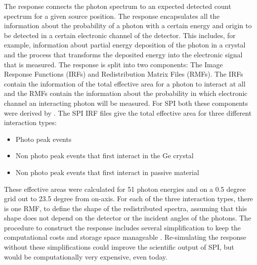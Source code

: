 \documentclass[twocolumn,traditabstract]{aa}
\begin{document}
The response connects the photon spectrum to an expected detected count spectrum for a given source position. The response encapsulates all the information about the probability of a photon with a certain energy and origin to be detected in a certain electronic channel of the detector. This includes, for example, information about partial energy deposition of the photon in a crystal and the process that transforms the deposited energy into the electronic signal that is measured.
The response is split into two components: The Image Response Functions (IRFs) and Redistribution Matrix Files (RMFs). The IRFs contain the information of the total effective area for a photon to interact at all and the RMFs contain the information about the probability in which electronic channel an interacting photon will be measured. For SPI both these components were derived by \citet{spi_response}.
The SPI IRF files give the total effective area for three different interaction types:
\begin{itemize}
  \item Photo peak events
  \item Non photo peak events that first interact in the Ge crystal
  \item Non photo peak events that first interact in passive material
\end{itemize}
\noindent
These effective areas were calculated for 51 photon energies and on a 0.5 degree grid out to 23.5 degree from on-axis. For each of the three interaction types, there is one RMF, to define the shape of the redistributed spectra, assuming that this shape does not depend on the detector or the incident angles of the photons. The procedure to construct the response includes several simplification to keep the computational costs and storage space manageable \citep{spi_response}. Re-simulating the response without these simplifications could improve the scientific output of SPI, but would be computationally very expensive, even today.
\end{document}
